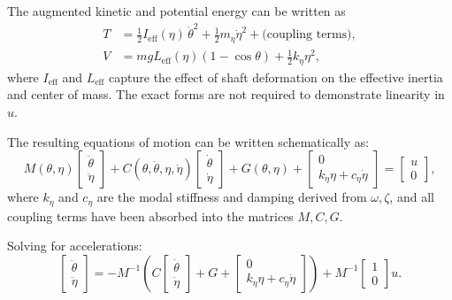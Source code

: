 \documentclass[12pt]{article}
\begin{document}
The augmented kinetic and potential energy can be written as
\begin{align}
  T &= \frac{1}{2} I_{\mathrm{eff}}(\eta)\,\dot{\theta}^2
       + \frac{1}{2} m_\eta \dot{\eta}^2
       + \text{(coupling terms)},\\
  V &= m g L_{\mathrm{eff}}(\eta) (1 - \cos\theta)
       + \frac{1}{2} k_\eta \eta^2,
\end{align}
where \(I_{\mathrm{eff}}\) and \(L_{\mathrm{eff}}\) capture the effect of shaft deformation on the effective inertia and center of mass. The exact forms are not required to demonstrate linearity in \(u\).

The resulting equations of motion can be written schematically as:
\begin{equation}
  M(\theta,\eta)
  \begin{bmatrix}
    \ddot{\theta} \\[0.2em]
    \ddot{\eta}
  \end{bmatrix}
  +
  C(\theta,\dot{\theta},\eta,\dot{\eta})
  \begin{bmatrix}
    \dot{\theta} \\[0.2em]
    \dot{\eta}
  \end{bmatrix}
  +
  G(\theta,\eta)
  +
  \begin{bmatrix}
    0 \\[0.2em]
    k_\eta \eta + c_\eta \dot{\eta}
  \end{bmatrix}
  =
  \begin{bmatrix}
    u \\[0.2em]
    0
  \end{bmatrix},
  \label{eq:pendulum_flex_block}
\end{equation}
where \(k_\eta\) and \(c_\eta\) are the modal stiffness and damping derived from \(\omega,\zeta\), and all coupling terms have been absorbed into the matrices \(M,C,G\).

Solving for accelerations:
\begin{equation}
  \begin{bmatrix}
    \ddot{\theta} \\[0.2em]
    \ddot{\eta}
  \end{bmatrix}
  =
  -M^{-1}
  \left(
    C
    \begin{bmatrix}
      \dot{\theta} \\ \dot{\eta}
    \end{bmatrix}
    + G +
    \begin{bmatrix}
      0 \\ k_\eta \eta + c_\eta \dot{\eta}
    \end{bmatrix}
  \right)
  +
  M^{-1}
  \begin{bmatrix}
    1 \\ 0
  \end{bmatrix} u.
  \label{eq:pendulum_flex_accel}
\end{equation}
\end{document}
